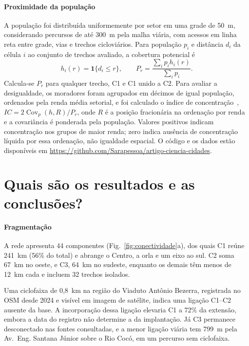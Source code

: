\documentclass[10pt,a4paper,twocolumn]{article}
\begin{document}
\paragraph{Proximidade da população} A população foi distribuída
uniformemente por setor em uma grade de 50~m, considerando percursos de
até 300~m pela malha viária, com acessos em linha reta entre grade, vias
e trechos cicloviários. Para população $p_i$ e distância $d_i$ da célula
$i$ ao conjunto de trechos avaliado, a cobertura potencial é
\begin{equation}
 h_i(r)=\mathbf{1}\{d_i\leq r\},\qquad
 P_r=\frac{\sum_i p_i h_i(r)}{\sum_i p_i}.
\end{equation}
Calcula-se $P_r$ para qualquer trecho, C1 e C1 unido a C2.
Para avaliar a desigualdade, os moradores foram
agrupados em décimos de igual população, ordenados pela renda média
setorial, e foi calculado o índice de concentração~\cite{wagstaff1991},
$IC=2\operatorname{Cov}_p(h,R)/P_r$, onde $R$ é a posição fracionária
na ordenação por renda e a covariância é ponderada pela população.
Valores positivos indicam concentração nos grupos de maior renda;
zero indica ausência de concentração líquida por essa ordenação,
não igualdade espacial. O código e os dados estão disponíveis em
\url{https://github.com/Sarapessoa/artigo-ciencia-cidades}.

\section{Quais são os resultados e as conclusões?}

\paragraph{Fragmentação} A rede apresenta 44 componentes
(Fig.~\ref{fig:conectividade}a), dos quais C1 reúne 241~km (56\% do total)
e abrange o Centro, a orla e um eixo ao sul. C2 soma 67~km no oeste,
e C3, 64~km no sudeste, enquanto os demais têm menos de 12~km cada
e incluem 32 trechos isolados.

Uma ciclofaixa de 0,8~km na região do Viaduto Antônio Bezerra, registrada
no OSM desde 2024 e visível em imagem de satélite, indica uma ligação
C1--C2 ausente da base. A incorporação dessa ligação elevaria C1 a 72\%
da extensão, embora a data do registro não determine a da implantação.
Já C3 permanece
desconectado nas fontes consultadas, e a menor ligação viária tem 799~m
pela Av.~Eng. Santana Júnior sobre o Rio Cocó, em um percurso sem ciclofaixa.
\end{document}
